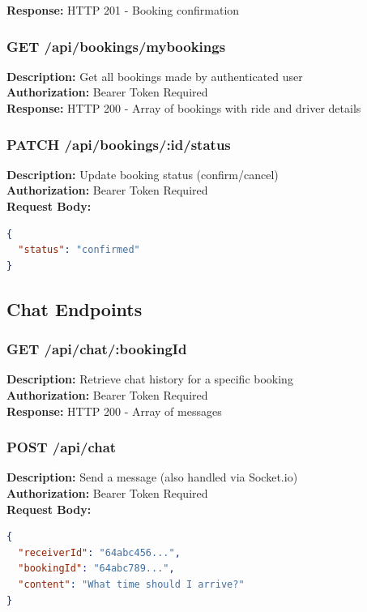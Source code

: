 \documentclass[12pt,a4paper]{article}
\begin{document}
\textbf{Response:} HTTP 201 - Booking confirmation

\subsubsection{GET /api/bookings/mybookings}
\textbf{Description:} Get all bookings made by authenticated user\\
\textbf{Authorization:} Bearer Token Required\\
\textbf{Response:} HTTP 200 - Array of bookings with ride and driver details

\subsubsection{PATCH /api/bookings/:id/status}
\textbf{Description:} Update booking status (confirm/cancel)\\
\textbf{Authorization:} Bearer Token Required\\
\textbf{Request Body:}
\begin{lstlisting}[language=JSON]
{
  "status": "confirmed"
}
\end{lstlisting}

\subsection{Chat Endpoints}

\subsubsection{GET /api/chat/:bookingId}
\textbf{Description:} Retrieve chat history for a specific booking\\
\textbf{Authorization:} Bearer Token Required\\
\textbf{Response:} HTTP 200 - Array of messages

\subsubsection{POST /api/chat}
\textbf{Description:} Send a message (also handled via Socket.io)\\
\textbf{Authorization:} Bearer Token Required\\
\textbf{Request Body:}
\begin{lstlisting}[language=JSON]
{
  "receiverId": "64abc456...",
  "bookingId": "64abc789...",
  "content": "What time should I arrive?"
}
\end{lstlisting}
\end{document}
